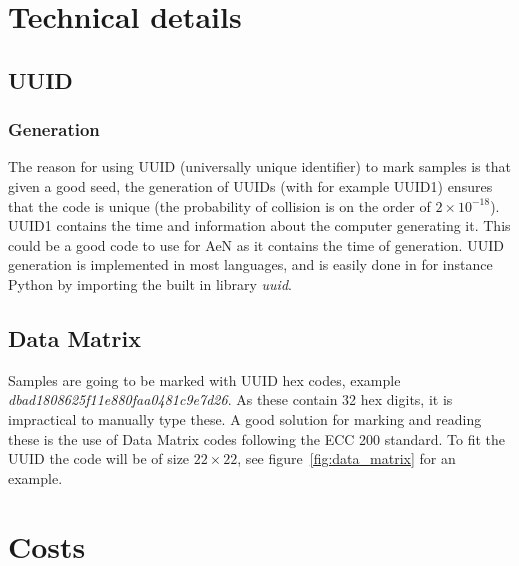 \documentclass[a4paper,english, 11pt]{article}
\begin{document}
\section{Technical details} %
\label{sec:Technical details}

\subsection{UUID} %
\label{sub:UUID}

\subsubsection{Generation} %
\label{ssub:Generation}

The reason for using UUID (universally unique identifier) to mark samples is that given a good seed, the generation of UUIDs (with for example UUID1) ensures that the code is unique (the probability of collision is on the order of $ 2\times10^{-18}$). UUID1 contains the time and information about the computer generating it. This could be a good code to use for AeN as it contains the time of generation. UUID generation is implemented in most languages, and is easily done in for instance Python by importing the built in library \emph{uuid}. 


\subsection{Data Matrix} %
\label{ssub:DM}
Samples are going to be marked with UUID hex codes, example \emph{dbad1808625f11e880faa0481c9e7d26}. As these contain 32 hex digits, it is impractical to manually type these. A good solution for marking and reading these is the use of Data Matrix codes following the ECC 200 standard. To fit the UUID the code will be of size  $22\times22$, see figure~\ref{fig:data_matrix} for an example.



\section{Costs} %
\label{sec:Costs}
\end{document}
